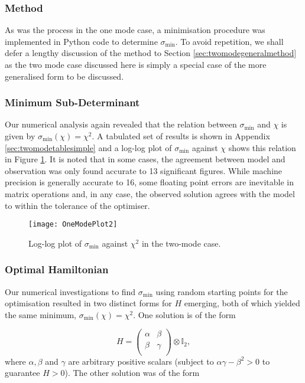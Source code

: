 \documentclass[11pt,a4paper]{article}
\numberwithin{equation}{section}
\begin{document}
	\subsubsection{Method}
	As was the process in the one mode case, a minimisation procedure was implemented in Python code to determine $\sigma_\text{min}$. To avoid repetition, we shall defer a lengthy discussion of the method to Section \ref{sec:twomodegeneralmethod} as the two mode case discussed here is simply a special case of the more generalised form to be discussed.
	
	\subsubsection{Minimum Sub-Determinant}
	\label{sec:twomodesimplemin}
	
	Our numerical analysis again revealed that the relation between $\sigma_\text{min}$ and $\chi$ is given by $\sigma_\text{min}(\chi)=\chi^{2}$. A tabulated set of results is shown in Appendix \ref{sec:twomodetablesimple} and a log-log plot of $\sigma_\text{min}$ against $\chi$ shows this relation in Figure \ref{fig:TwoModePlot}. It is noted that in some cases, the agreement between model and observation was only found accurate to 13 significant figures. While machine precision is generally accurate to 16, some floating point errors are inevitable in matrix operations and, in any case, the observed solution agrees with the model to within the tolerance of the optimiser.
	
	\begin{figure} [h]
		\centering
		\texttt{[image: OneModePlot2]}
		\caption[Two mode case: log-log plot of $\sigma_\text{min}$ against $\chi^2$]{Log-log plot of $\sigma_\text{min}$ against $\chi^2$ in the two-mode case.}
		\label{fig:TwoModePlot}
	\end{figure}
	
	\subsubsection{Optimal Hamiltonian}
	
	Our numerical investigations to find $\sigma_\text{min}$ using random starting points for the optimisation resulted in two distinct forms for $H$ emerging, both of which yielded the same minimum, $\sigma_\text{min}(\chi)=\chi^{2}$. One solution is of the form
	
	\begin{equation}\label{eq:45}
		H = \begin{pmatrix}
			\alpha & \beta \\
			\beta & \gamma \\
		\end{pmatrix} \otimes \mathbb{I}_2,
	\end{equation}
	where $\alpha, \beta$ and $\gamma$ are arbitrary positive scalars (subject to $\alpha\gamma - \beta^2 > 0$ to guarantee $H>0$). The other solution was of the form
\end{document}
